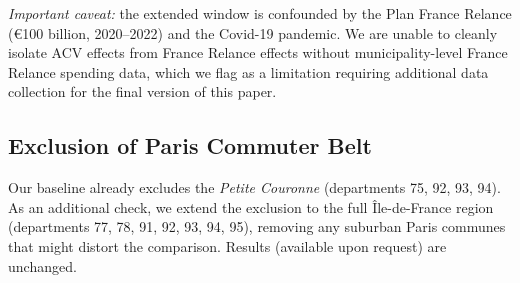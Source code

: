 \textit{Important caveat:} the extended window is confounded by the Plan France Relance (€100 billion, 2020--2022) and the Covid-19 pandemic. We are unable to cleanly isolate ACV effects from France Relance effects without municipality-level France Relance spending data, which we flag as a limitation requiring additional data collection for the final version of this paper.

\subsection{Exclusion of Paris Commuter Belt}

Our baseline already excludes the \textit{Petite Couronne} (departments 75, 92, 93, 94). As an additional check, we extend the exclusion to the full Île-de-France region (departments 77, 78, 91, 92, 93, 94, 95), removing any suburban Paris communes that might distort the comparison. Results (available upon request) are unchanged.
